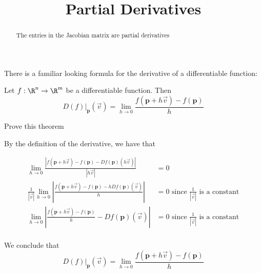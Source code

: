 \documentclass{ximera}
\title{Partial Derivatives}
\begin{document}
	\begin{abstract}
		The entries in the Jacobian matrix are partial derivatives
	\end{abstract}


	There is a familiar looking formula for the derivative of a differentiable function:
	
	\begin{theorem}
		Let $f:\R^n \to \R^m$ be a differentiable function.  Then
		\[
			D(f)\big|_{\mathbf{p}}(\vec{v}) = \displaystyle\lim_{h \to 0} \frac{f(\mathbf{p}+h\vec{v}) -f(\mathbf{p})}{h}
		\]
	\end{theorem}
	
	Prove this theorem
	
	\begin{free-response}
		By the definition of the derivative, we have that
		
		\begin{align*}
			\lim_{h \to 0} \frac{\left|f(\mathbf{p}+h\vec{v}) - f(\mathbf{p}) - Df(\mathbf{p})(h\vec{v})\right|}{|h\vec{v}|} &= 0\\
			\frac{1}{|\vec{v}|}\lim_{h \to 0} \left| \frac{f(\mathbf{p}+h\vec{v}) - f(\mathbf{p}) - hDf(\mathbf{p})(\vec{v})}{h} \right| &=0 \text{ since $\frac{1}{|\vec{v}|}$ is a constant}\\
			\lim_{h \to 0} \left| \frac{f(\mathbf{p}+h\vec{v}) - f(\mathbf{p})}{h} - Df(\mathbf{p})(\vec{v})\right| &=0 \text{ since $\frac{1}{|\vec{v}|}$ is a constant}\\
		\end{align*}
		
		We conclude that
		\[
			D(f)\big|_{\mathbf{p}}(\vec{v}) = \lim_{h \to 0} \frac{f(\mathbf{p}+h\vec{v}) -f(\mathbf{p})}{h}
		\]
	\end{free-response}
	
\end{document}

